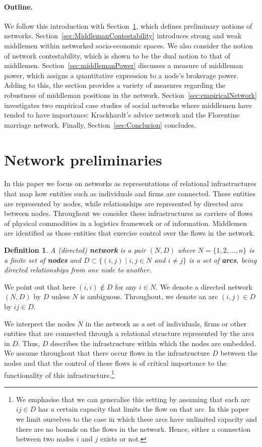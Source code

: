 \documentclass[11pt,fleqn]{article}
\newtheorem{definition}[theorem]{Definition}
\begin{document}
\paragraph{Outline.}

We follow this introduction with Section~\ref{sec:NetworkPreliminaries}, which defines preliminary notions of networks. Section~\ref{sec:MiddlemanContestability} introduces strong and weak middlemen within networked socio-economic spaces. We also consider the notion of network contestability, which is shown to be the dual notion to that of middlemen. Section~\ref{sec:middlemanPower} discusses a measure of middleman power, which assigns a quantitative expression to a node's brokerage power. Adding to this, the section provides a variety of measures regarding the robustness of middleman positions in the network. Section~\ref{sec:empiricalNetwork} investigates two empirical case studies of social networks where middlemen have tended to have importance: Krackhardt's advice network and the Florentine marriage network. Finally, Section~\ref{sec:Conclusion} concludes.

\section{Network preliminaries}
\label{sec:NetworkPreliminaries}

In this paper we focus on networks as representations of relational infrastructures that map how entities such as individuals and firms are connected. These entities are represented by nodes, while relationships are represented by directed arcs between nodes. Throughout we consider these infrastructures as carriers of flows of physical commodities in a logistics framework or of information. Middlemen are identified as those entities that exercise control over the flows in the network.
\begin{definition}
	A (directed) \textbf{network} is a pair $(N,D)$ where $N = \{1,2, \ldots ,n\}$ is a finite set of \textbf{nodes} and $D \subset \{ (i,j) \mid i,j \in N$ and $i \neq j \}$ is a set of \textbf{arcs}, being directed relationships from one node to another.
\end{definition}

\noindent
We point out that here $(i,i) \notin D$ for any $i \in N$. We denote a directed network $(N,D)$ by $D$ unless $N$ is ambiguous. Throughout, we denote an arc $(i,j) \in D$ by $ij \in D$.

We interpret the nodes $N$ in the network as a set of individuals, firms or other entities that are connected through a relational structure represented by the arcs in $D$. Thus, $D$ describes the infrastructure within which the nodes are embedded. We assume throughout that there occur flows in the infrastructure $D$ between the nodes and that the control of these flows is of critical importance to the functionality of this infrastructure.\footnote{We emphasise that we can generalise this setting by assuming that each arc $ij \in D$ has a certain capacity that limits the flow on that arc. In this paper we limit ourselves to the case in which these arcs have unlimited capacity and there are no bounds on the flows in the network. Hence, either a connection between two nodes $i$ and $j$ exists or not.}
\end{document}
